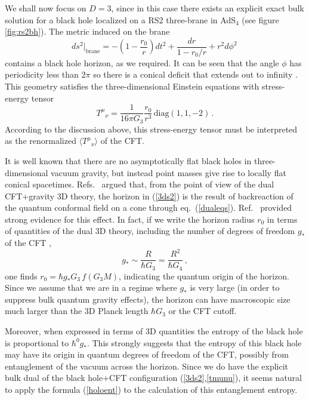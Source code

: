 \documentclass[12pt]{article}
\newcommand{\beq}{\begin{equation}}
\newcommand{\eeq}{\end{equation}}
\newcommand{\reef}[1]{(\ref{#1})}
\begin{document}
We shall now focus on $D=3$, since in this case there exists an explicit
exact bulk solution for a black hole localized on a RS2 three-brane in
AdS$_4$ \cite{ehm1} (see figure \ref{fig:rs2bh}). The metric induced on
the brane
\beq\label{3ds2}
ds^2|_\mathrm{brane}=-\left(1-\frac{r_0}{r}\right)dt^2+\frac{dr}{1-r_0/r}
+r^2d\phi^2\,
\eeq
contains a black hole horizon, as we
required. It can be seen that the angle $\phi$ has periodicity less than
$2\pi$ so there is a conical deficit that extends out to infinity
\cite{ehm1}. This geometry satisfies the three-dimensional Einstein
equations with stress-energy tensor
\beq\label{tmunu}
{T^\mu}_\nu=\frac{1}{16\pi G_{3}}\frac{r_0}{r^3}\,\mathrm{diag}(1,1,-2)\,.
\eeq
According to the discussion above, this stress-energy tensor must be
interpreted as the renormalized $\langle {T^\mu}_\nu\rangle$ of the CFT.

It is well known that there are no asymptotically flat black holes in
three-dimensional vacuum gravity, but instead point masses give rise to
locally flat conical spacetimes. Refs.~\cite{tanaka,efk} argued that, from the
point of view of the dual CFT+gravity 3D theory, the horizon in
\reef{3ds2} is the result of backreaction of the quantum conformal field
on a cone through eq.~\reef{dualeqs}. Ref.~\cite{efk} provided strong
evidence for this effect. In fact, if we write the horizon radius $r_0$
in terms of quantities of the dual 3D theory, including the
number of degrees of freedom $g_*$ of the CFT ,
\beq\label{gstar}
g_*\sim \frac{R}{\hbar G_3}=\frac{R^2}{\hbar G_4}\,,
\eeq
one finds $r_0=\hbar g_* G_3\, f(G_3M)$, indicating the quantum origin
of the horizon. Since we assume that we are in a regime where
$g_*$ is very large (in order to suppress bulk quantum gravity effects),
the horizon can have macroscopic size much larger than the 3D Planck
length $\hbar G_3$ or the CFT cutoff. 

Moreover, when expressed in terms of 3D quantities the entropy of the
black hole is proportional to $\hbar^0 g_*$. This strongly suggests
that the entropy of this black hole may have its origin in quantum
degrees of freedom of the CFT, possibly from entanglement of the vacuum
across the horizon. Since we do have
the explicit bulk dual of the black hole+CFT configuration
(\ref{3ds2},\ref{tmunu}), it seems natural to apply the formula
\reef{holoent} to the calculation of this entanglement entropy.
\end{document}
